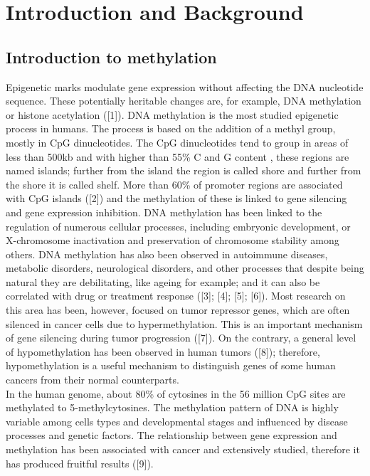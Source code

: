 \documentclass[10pt,letterpaper]{article}
\begin{document}

\linenumbers

\hypertarget{introduction-and-background}{%
\section{Introduction and
Background}\label{introduction-and-background}}

\hypertarget{introduction-to-methylation}{%
\subsection{Introduction to
methylation}\label{introduction-to-methylation}}

Epigenetic marks modulate gene expression without affecting the DNA
nucleotide sequence. These potentially heritable changes are, for
example, DNA methylation or histone acetylation ({[}1{]}). DNA
methylation is the most studied epigenetic process in humans. The
process is based on the addition of a methyl group, mostly in CpG
dinucleotides. The CpG dinucleotides tend to group in areas of less than
500kb and with higher than 55\% C and G content , these regions are
named islands; further from the island the region is called shore and
further from the shore it is called shelf. More than 60\% of promoter
regions are associated with CpG islands ({[}2{]}) and the methylation of
these is linked to gene silencing and gene expression inhibition. DNA
methylation has been linked to the regulation of numerous cellular
processes, including embryonic development, or X-chromosome inactivation
and preservation of chromosome stability among others. DNA methylation
has also been observed in autoimmune diseases, metabolic disorders,
neurological disorders, and other processes that despite being natural
they are debilitating, like ageing for example; and it can also be
correlated with drug or treatment response ({[}3{]}; {[}4{]}; {[}5{]};
{[}6{]}). Most research on this area has been, however, focused on tumor
repressor genes, which are often silenced in cancer cells due to
hypermethylation. This is an important mechanism of gene silencing
during tumor progression ({[}7{]}). On the contrary, a general level of
hypomethylation has been observed in human tumors ({[}8{]}); therefore,
hypomethylation is a useful mechanism to distinguish genes of some human
cancers from their normal counterparts.\\
In the human genome, about 80\% of cytosines in the 56 million CpG sites
are methylated to 5-methylcytosines. The methylation pattern of DNA is
highly variable among cells types and developmental stages and
influenced by disease processes and genetic factors. The relationship
between gene expression and methylation has been associated with cancer
and extensively studied, therefore it has produced fruitful results
({[}9{]}).
\end{document}
